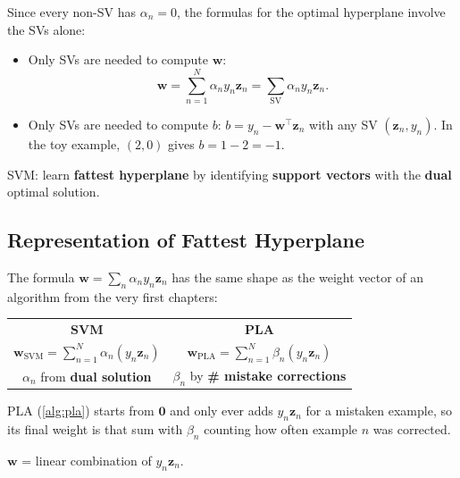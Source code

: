 Since every non-SV has \(\alpha_n = 0\), the formulas for the optimal
hyperplane involve the SVs alone:
\begin{itemize}
    \item Only SVs are needed to compute \(\bm{w}\):
        \[
            \bm{w} = \sum_{n=1}^N \alpha_n y_n \bm{z}_n = \sum_{\text{SV}}
            \alpha_n y_n \bm{z}_n.
        \]
    \item Only SVs are needed to compute \(b\): \(b = y_n - \bm{w}^\top
        \bm{z}_n\) with any SV \((\bm{z}_n, y_n)\). In the toy example,
        \((2, 0)\) gives \(b = 1 - 2 = -1\).
\end{itemize}

\begin{moral}
    SVM: learn \textbf{fattest hyperplane} by identifying \textbf{support
    vectors} with the \textbf{dual} optimal solution.
\end{moral}

\subsection{Representation of Fattest Hyperplane}

The formula \(\bm{w} = \sum_n \alpha_n y_n \bm{z}_n\) has the same shape as
the weight vector of an algorithm from the very first chapters:

\begin{center}
    \begin{tabular}{@{}c@{\qquad\qquad}c@{}}
        \textbf{SVM} & \textbf{PLA}\\[4pt]
        \(\displaystyle \bm{w}_{\mathrm{SVM}} = \sum_{n=1}^N \alpha_n (y_n
            \bm{z}_n)\)
        &
        \(\displaystyle \bm{w}_{\mathrm{PLA}} = \sum_{n=1}^N \beta_n (y_n
            \bm{z}_n)\)\\[12pt]
        \(\alpha_n\) from \textbf{dual solution} & \(\beta_n\) by
            \textbf{\# mistake corrections}
    \end{tabular}
\end{center}

PLA (\autoref{alg:pla}) starts from \(\bm{0}\) and only ever adds \(y_n
\bm{z}_n\) for a mistaken example, so its final weight is that sum with
\(\beta_n\) counting how often example \(n\) was corrected.

\begin{moral}
    \(\bm{w}\) = linear combination of \(y_n \bm{z}_n\).
\end{moral}

